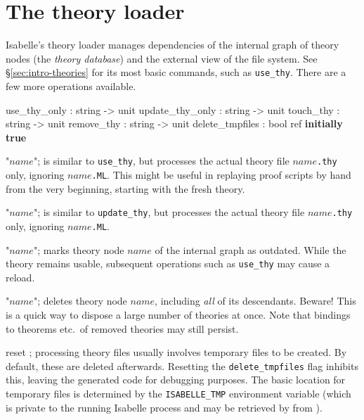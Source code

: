 \section{The theory loader}\label{sec:more-theories}

Isabelle's theory loader manages dependencies of the internal graph of theory
nodes (the \emph{theory database}) and the external view of the file system.
See \S\ref{sec:intro-theories} for its most basic commands, such as
\texttt{use_thy}.  There are a few more operations available.

\begin{ttbox}
use_thy_only    : string -> unit
update_thy_only : string -> unit
touch_thy       : string -> unit
remove_thy      : string -> unit
delete_tmpfiles : bool ref \hfill\textbf{initially true}
\end{ttbox}

\begin{ttdescription}
\item[\ttindexbold{use_thy_only} "$name$";] is similar to \texttt{use_thy},
  but processes the actual theory file $name$\texttt{.thy} only, ignoring
  $name$\texttt{.ML}.  This might be useful in replaying proof scripts by hand
  from the very beginning, starting with the fresh theory.
  
\item[\ttindexbold{update_thy_only} "$name$";] is similar to
  \texttt{update_thy}, but processes the actual theory file
  $name$\texttt{.thy} only, ignoring $name$\texttt{.ML}.

\item[\ttindexbold{touch_thy} "$name$";] marks theory node $name$ of the
  internal graph as outdated.  While the theory remains usable, subsequent
  operations such as \texttt{use_thy} may cause a reload.
  
\item[\ttindexbold{remove_thy} "$name$";] deletes theory node $name$,
  including \emph{all} of its descendants.  Beware!  This is a quick way to
  dispose a large number of theories at once.  Note that {\ML} bindings to
  theorems etc.\ of removed theories may still persist.
  
\item[reset \ttindexbold{delete_tmpfiles};] processing theory files usually
  involves temporary {\ML} files to be created.  By default, these are deleted
  afterwards.  Resetting the \texttt{delete_tmpfiles} flag inhibits this,
  leaving the generated code for debugging purposes.  The basic location for
  temporary files is determined by the \texttt{ISABELLE_TMP} environment
  variable (which is private to the running Isabelle process and may be
  retrieved by  from {\ML}).
\end{ttdescription}

